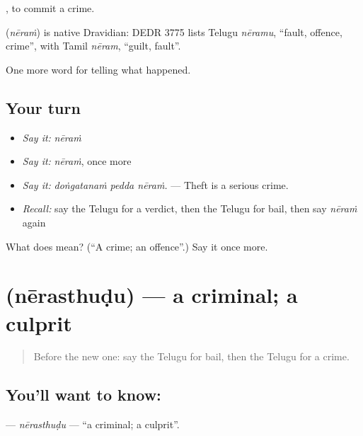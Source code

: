  , to commit a crime.

\begin{cousinweb}
\textbf{} (\emph{nēraṁ}) is native Dravidian: DEDR 3775 lists Telugu \emph{nēramu}, \textquotedblleft{}fault, offence, crime\textquotedblright{}, with Tamil \emph{nēram}, \textquotedblleft{}guilt, fault\textquotedblright{}.
\end{cousinweb}

\begin{grammarlens}[title={What you've built}]
One more word for telling what happened.
\end{grammarlens}

\subsection*{Your turn}
\begin{itemize}
\raggedright
  \item \emph{Say it:} \emph{nēraṁ}
  \item \emph{Say it:} \emph{nēraṁ}, once more
  \item \emph{Say it:} \emph{doṅgatanaṁ pedda nēraṁ.} — Theft is a serious crime.
  \item \emph{Recall:} say the Telugu for a verdict, then the Telugu for bail, then say \emph{nēraṁ} again
\end{itemize}

\begin{tcolorbox}[breakable,colback=teal!4,colframe=teal!35!black,title={Before you move on}]
What does  mean? (\textquotedblleft{}A crime; an offence\textquotedblright{}.) Say it once more.
\end{tcolorbox}
\section[\texorpdfstring{\te{నేరస్థుడు} (nērasthuḍu)}{నేరస్థుడు (nērasthuḍu)}]{ (nērasthuḍu) — a criminal; a culprit}

\label{lesson:TE-C350-nerasthudu}



\begin{quote}
Before the new one: say the Telugu for bail, then the Telugu for a crime.
\end{quote}

\subsection*{You'll want to know: }
\textbf{} — \emph{nērasthuḍu} — \textquotedblleft{}a criminal; a culprit\textquotedblright{}.

